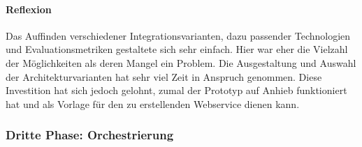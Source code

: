 \paragraph{Reflexion}

Das Auffinden verschiedener Integrationsvarianten, dazu passender Technologien und Evaluationsmetriken gestaltete sich sehr einfach. Hier war eher die Vielzahl der Möglichkeiten als deren Mangel ein Problem. Die Ausgestaltung und Auswahl der Architekturvarianten hat sehr viel Zeit in Anspruch genommen. Diese Investition hat sich jedoch gelohnt, zumal der Prototyp auf Anhieb funktioniert hat und als Vorlage für den zu erstellenden Webservice dienen kann.

\subsubsection{Dritte Phase: Orchestrierung}


